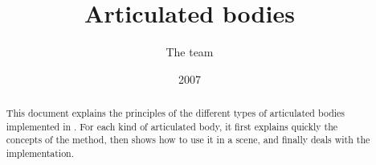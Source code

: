 \documentclass[a4paper,11pt]{article}
\title{Articulated bodies}
\author{The \sofa{} team}
\date{2007}
\begin{document}
 
\maketitle

\begin{abstract}
This document explains the principles of the different types of articulated bodies implemented in \sofa.
For each kind of articulated body, it first explains quickly the concepts of the method, then shows how to use it in a scene, and finally deals with the implementation.
\end{abstract}

\tableofcontents
\newpage

\newpage

\end{document}
